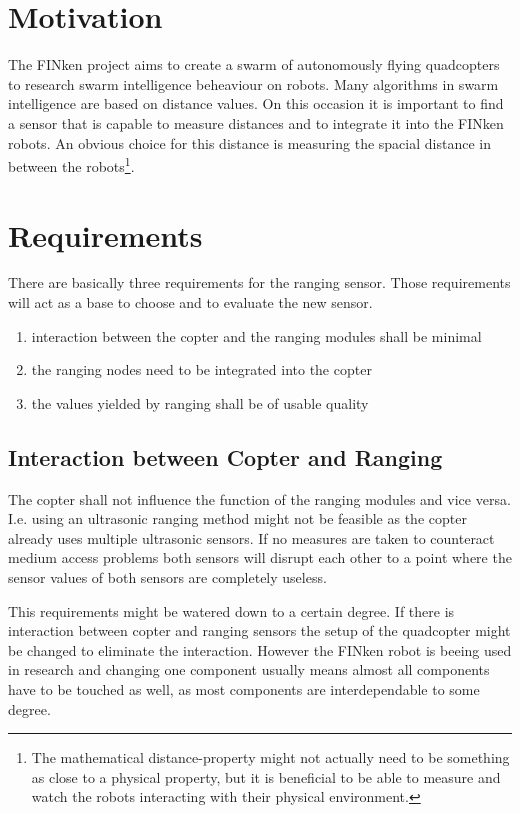 \section{Motivation}

The FINken project aims to create a swarm of autonomously flying quadcopters to research swarm intelligence beheaviour on robots.
Many algorithms in swarm intelligence are based on distance values. 
On this occasion it is important to find a sensor that is capable to measure distances and to integrate it into the FINken robots.
An obvious choice for this distance is measuring the spacial distance in between the robots\footnote{
The mathematical distance-property might not actually need to be something as close to a physical property, but it is beneficial to be able to measure and watch the robots interacting with their physical environment.}.


\section{Requirements}
\label{req}
There are basically three requirements for the ranging sensor.
Those requirements will act as a base to choose and to evaluate the new sensor.

\begin{enumerate}
	\item interaction between the copter and the ranging modules shall be minimal
	\item the ranging nodes need to be integrated into the copter
	\item the values yielded by ranging shall be of usable quality
\end{enumerate}

\subsection{Interaction between Copter and Ranging}
\label{req1}
The copter shall not influence the function of the ranging modules and vice versa.
I.e. using an ultrasonic ranging method might not be feasible as the copter already uses multiple ultrasonic sensors.
If no measures are taken to counteract medium access problems both sensors will disrupt each other to a point where the sensor values of both sensors are completely useless.

This requirements might be watered down to a certain degree.
If there is interaction between copter and ranging sensors the setup of the quadcopter might be changed to eliminate the interaction.
However the FINken robot is beeing used in research and changing one component usually means almost all components have to be touched as well, as most components are interdependable to some degree.

